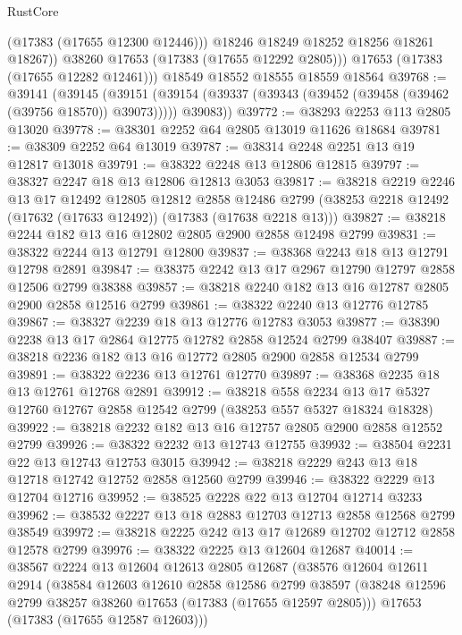 \begin{lexlean}{RustCore}
\begin{coremodule}
              (@17383 (@17655 @12300 @12446)))
            @18246
            @18249
            @18252
            @18256
            @18261
            @18267))
        @38260
        @17653
        (@17383 (@17655 @12292 @2805)))
      @17653
      (@17383 (@17655 @12282 @12461)))
    @18549
    @18552
    @18555
    @18559
    @18564
@39768 := @39141
    (@39145
      (@39151 (@39154 (@39337 (@39343 (@39452 (@39458 (@39462 (@39756 @18570)) @39073))))) @39083))
@39772 := @38293 @2253 @113 @2805 @13020
@39778 := @38301 @2252 @64 @2805 @13019 @11626 @18684
@39781 := @38309 @2252 @64 @13019
@39787 := @38314 @2248 @2251 @13 @19 @12817 @13018
@39791 := @38322 @2248 @13 @12806 @12815
@39797 := @38327 @2247 @18 @13 @12806 @12813 @3053
@39817 := @38218
    @2219
    @2246
    @13
    @17
    @12492
    @12805
    @12812
    @2858
    @12486
    @2799
    (@38253 @2218 @12492 (@17632 (@17633 @12492)) (@17383 (@17638 @2218 @13)))
@39827 := @38218 @2244 @182 @13 @16 @12802 @2805 @2900 @2858 @12498 @2799
@39831 := @38322 @2244 @13 @12791 @12800
@39837 := @38368 @2243 @18 @13 @12791 @12798 @2891
@39847 := @38375 @2242 @13 @17 @2967 @12790 @12797 @2858 @12506 @2799 @38388
@39857 := @38218 @2240 @182 @13 @16 @12787 @2805 @2900 @2858 @12516 @2799
@39861 := @38322 @2240 @13 @12776 @12785
@39867 := @38327 @2239 @18 @13 @12776 @12783 @3053
@39877 := @38390 @2238 @13 @17 @2864 @12775 @12782 @2858 @12524 @2799 @38407
@39887 := @38218 @2236 @182 @13 @16 @12772 @2805 @2900 @2858 @12534 @2799
@39891 := @38322 @2236 @13 @12761 @12770
@39897 := @38368 @2235 @18 @13 @12761 @12768 @2891
@39912 := @38218
    @558
    @2234
    @13
    @17
    @5327
    @12760
    @12767
    @2858
    @12542
    @2799
    (@38253 @557 @5327 @18324 @18328)
@39922 := @38218 @2232 @182 @13 @16 @12757 @2805 @2900 @2858 @12552 @2799
@39926 := @38322 @2232 @13 @12743 @12755
@39932 := @38504 @2231 @22 @13 @12743 @12753 @3015
@39942 := @38218 @2229 @243 @13 @18 @12718 @12742 @12752 @2858 @12560 @2799
@39946 := @38322 @2229 @13 @12704 @12716
@39952 := @38525 @2228 @22 @13 @12704 @12714 @3233
@39962 := @38532 @2227 @13 @18 @2883 @12703 @12713 @2858 @12568 @2799 @38549
@39972 := @38218 @2225 @242 @13 @17 @12689 @12702 @12712 @2858 @12578 @2799
@39976 := @38322 @2225 @13 @12604 @12687
@40014 := @38567
    @2224
    @13
    @12604
    @12613
    @2805
    @12687
    (@38576
      @12604
      @12611
      @2914
      (@38584
        @12603
        @12610
        @2858
        @12586
        @2799
        @38597
        (@38248 @12596 @2799 @38257 @38260 @17653 (@17383 (@17655 @12597 @2805)))
        @17653
        (@17383 (@17655 @12587 @12603)))

\end{coremodule}
\end{lexlean}
